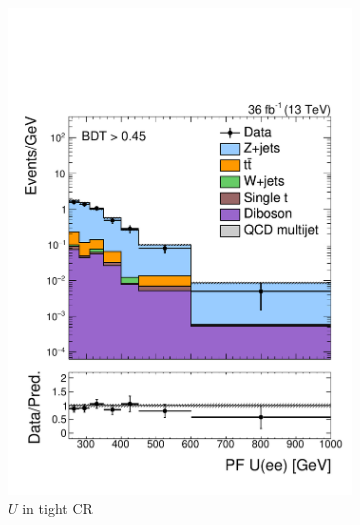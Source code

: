 \begin{figure}[]
\begin{center}
        \begin{subfigure}[t]{0.32\textwidth}
            \includegraphics[width=\textwidth]{figures/monotop/prefit/dielectron_tight_pfUZmag_logy.pdf}
            \caption{$U$ in tight CR}
        \end{subfigure}
        \begin{subfigure}[t]{0.32\textwidth}

\end{subfigure}
\end{center}
\end{figure}
